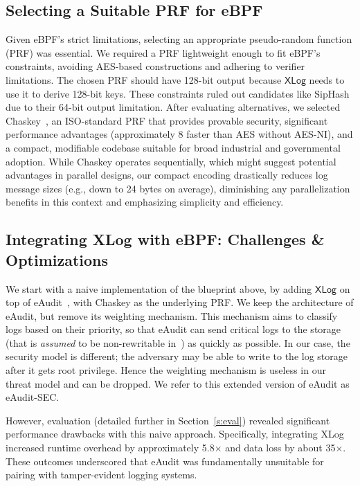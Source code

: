 \documentclass[sigconf]{sty/acmart}
\newcommand{\ed}{eAudit\xspace}
\newcommand{\edm}{eAudit-SEC\xspace}
\newcommand{\xlog}{XLog\xspace}
\newcommand{\secref}[1]{Section~\ref{#1}}
\newcommand{\XLog}{\mathsf{XLog}}
\begin{document}
\subsection{Selecting a Suitable PRF for eBPF}
Given eBPF's strict limitations, selecting an appropriate pseudo-random function (PRF) was essential. We required a PRF lightweight enough to fit eBPF's constraints, avoiding AES-based constructions and adhering to verifier limitations. 
The chosen PRF should have 128-bit output because $\XLog$ needs to use it  to derive 128-bit keys. 
These constraints ruled out candidates like SipHash~\cite{SipHash} due to their 64-bit output limitation. After evaluating alternatives, we selected Chaskey~\cite{Chaskey}, an ISO-standard PRF that provides provable security, significant performance advantages (approximately 8 faster than AES without AES-NI), and a compact, modifiable codebase suitable for broad industrial and governmental adoption. While Chaskey operates sequentially, which might suggest potential advantages in parallel designs, our compact encoding drastically reduces log message sizes (e.g., down to 24 bytes on average), diminishing any parallelization benefits in this context and emphasizing simplicity and efficiency.

\subsection{Integrating \xlog with eBPF: Challenges \& Optimizations}
\label{d:naive}
We start with a naive implementation of the blueprint above,
by adding $\XLog$ on top of eAudit~\cite{Sekar2023eAA}, with Chaskey as the underlying PRF.
We keep the architecture of eAudit, but remove its weighting mechanism.
This mechanism aims to classify logs based on their priority,
so that eAudit can send critical logs to the storage (that is \emph{assumed} to be non-rewritable in~\cite{Sekar2023eAA}) as quickly as possible.
In our case, the security model is different; the adversary may be able to write to the log storage after it gets root privilege. Hence
the weighting mechanism is useless in our threat model and can be dropped. We refer to this extended version of \ed as \edm.


However, evaluation (detailed further in \secref{s:eval}) revealed significant performance drawbacks with this naive approach. Specifically, integrating \xlog increased runtime overhead by approximately 5.8$\times$ and data loss by about 35$\times$. These outcomes underscored that \ed was fundamentally unsuitable for pairing with tamper-evident logging systems.
\end{document}
